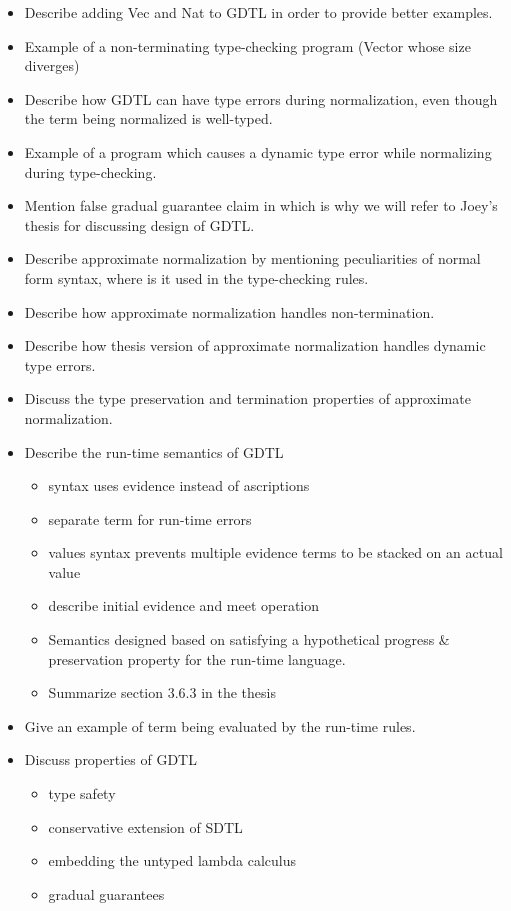 \documentclass{article}
\theoremstyle{definition}
\begin{document}
\begin{itemize}
  \item Describe adding Vec and Nat to GDTL in order to provide better examples.
  \item Example of a non-terminating type-checking program (Vector whose size diverges)
  \item Describe how GDTL can have type errors during normalization, even though
    the term being normalized is well-typed.
  \item Example of a program which causes a dynamic type error while normalizing
    during type-checking.
  \item Mention false gradual guarantee claim in
    \cite{eremondi_approximate_2019} which is why we will refer to Joey's thesis
    \cite{eremondi_design_2023} for discussing design of GDTL.
  \item Describe approximate normalization by mentioning peculiarities of normal
    form syntax, where is it used in the type-checking rules.
  \item Describe how approximate normalization handles non-termination.
  \item Describe how thesis version of approximate normalization handles dynamic
    type errors.
  \item Discuss the type preservation and termination properties of approximate
    normalization.
  \item Describe the run-time semantics of GDTL
    \begin{itemize}
    \item syntax uses evidence instead of ascriptions
    \item separate term for run-time errors
    \item values syntax prevents multiple evidence terms to be stacked on an actual value
    \item describe initial evidence and meet operation
    \item Semantics designed based on satisfying a hypothetical progress
      \& preservation property for the run-time language.
    \item Summarize section 3.6.3 in the thesis
    \end{itemize}
  \item Give an example of term being evaluated by the run-time rules.
  \item Discuss properties of GDTL
    \begin{itemize}
      \item type safety
      \item conservative extension of SDTL
      \item embedding the untyped lambda calculus
      \item gradual guarantees
    \end{itemize}
\end{itemize}
\end{document}
